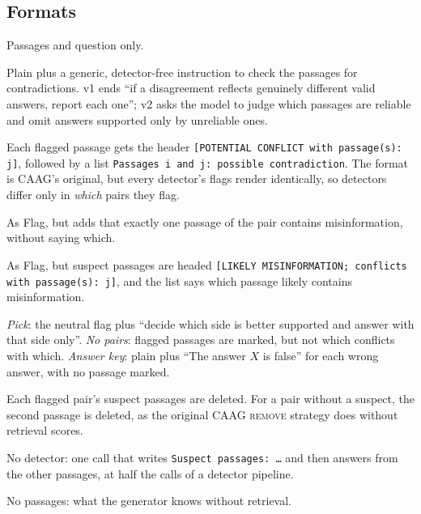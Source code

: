 \subsection{Formats}
\label{sec:formats}
\begin{description}[leftmargin=0pt,itemsep=1pt,topsep=2pt]
\item[No flags (plain).] Passages and question only.
\item[Instruction.] Plain plus a generic, detector-free instruction to check the passages for contradictions.
v1 ends ``if a disagreement reflects genuinely different valid answers, report each one''; v2 asks the model to
judge which passages are reliable and omit answers supported only by unreliable ones.
\item[Flag (neutral).] Each flagged passage gets the header \texttt{[POTENTIAL CONFLICT with passage(s): j]}, followed by a list
\texttt{Passages i and j: possible contradiction}. The format is CAAG's original, but every detector's
flags render identically, so detectors differ only in \emph{which} pairs they flag.
\item[One-wrong flag.] As Flag, but adds that exactly one passage of the pair contains misinformation, without saying
which.
\item[Directional flag.] As Flag, but suspect passages are headed \texttt{[LIKELY MISINFORMATION; conflicts with
passage(s): j]}, and the list says which passage likely contains misinformation.
\item[Controls.] \emph{Pick}: the neutral flag plus ``decide which side is better supported and answer with that
side only''. \emph{No pairs}: flagged passages are marked, but not which conflicts
with which. \emph{Answer key}: plain plus ``The answer $X$ is false'' for each wrong answer, with no passage marked.
\item[Remove (suspect).] Each flagged pair's suspect passages are deleted. For a pair without a suspect, the
second passage is deleted, as the original CAAG \textsc{remove} strategy does without retrieval scores.
\item[Single call.] No detector: one call that writes \texttt{Suspect passages: \dots} and then answers from
the other passages, at half the calls of a detector pipeline.
\item[Closed book.] No passages: what the generator knows without retrieval.
\end{description}

